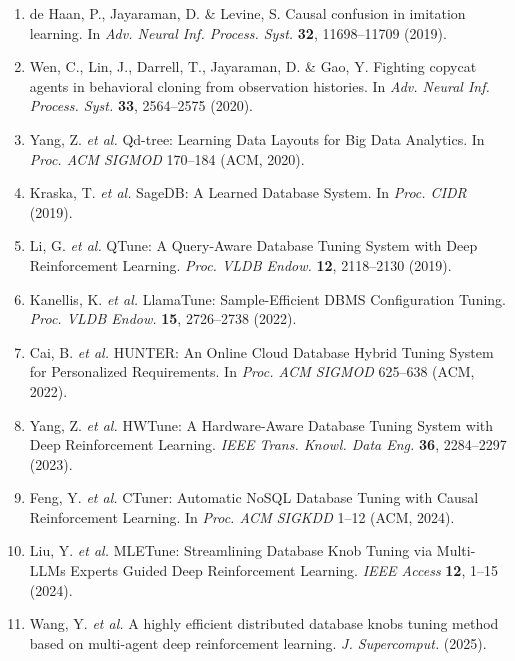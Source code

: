 \documentclass[fleqn,10pt]{wlscirep}
\begin{document}
\begin{enumerate}
\item de Haan, P., Jayaraman, D. \& Levine, S. Causal confusion in
  imitation learning. In \textit{Adv. Neural Inf. Process. Syst.}
  \textbf{32}, 11698--11709 (2019).

\item Wen, C., Lin, J., Darrell, T., Jayaraman, D. \& Gao, Y. Fighting
  copycat agents in behavioral cloning from observation histories. In
  \textit{Adv. Neural Inf. Process. Syst.} \textbf{33}, 2564--2575
  (2020).

\item Yang, Z. \textit{et al.} Qd-tree: Learning Data Layouts for Big
  Data Analytics. In \textit{Proc. ACM SIGMOD} 170--184 (ACM, 2020).

\item Kraska, T. \textit{et al.} SageDB: A Learned Database System. In
  \textit{Proc. CIDR} (2019).

\item Li, G. \textit{et al.} QTune: A Query-Aware Database Tuning System
  with Deep Reinforcement Learning. \textit{Proc. VLDB Endow.}
  \textbf{12}, 2118--2130 (2019).

\item Kanellis, K. \textit{et al.} LlamaTune: Sample-Efficient DBMS
  Configuration Tuning. \textit{Proc. VLDB Endow.} \textbf{15},
  2726--2738 (2022).

\item Cai, B. \textit{et al.} HUNTER: An Online Cloud Database Hybrid
  Tuning System for Personalized Requirements. In \textit{Proc. ACM
  SIGMOD} 625--638 (ACM, 2022).

\item Yang, Z. \textit{et al.} HWTune: A Hardware-Aware Database Tuning
  System with Deep Reinforcement Learning. \textit{IEEE Trans. Knowl.
  Data Eng.} \textbf{36}, 2284--2297 (2023).

\item Feng, Y. \textit{et al.} CTuner: Automatic NoSQL Database Tuning
  with Causal Reinforcement Learning. In \textit{Proc. ACM SIGKDD}
  1--12 (ACM, 2024).

\item Liu, Y. \textit{et al.} MLETune: Streamlining Database Knob Tuning
  via Multi-LLMs Experts Guided Deep Reinforcement Learning.
  \textit{IEEE Access} \textbf{12}, 1--15 (2024).

\item Wang, Y. \textit{et al.} A highly efficient distributed database
  knobs tuning method based on multi-agent deep reinforcement learning.
  \textit{J. Supercomput.} (2025).


\end{enumerate}
\end{document}
